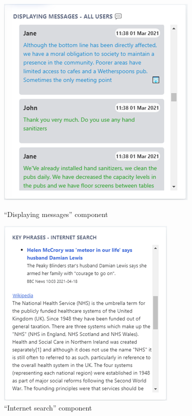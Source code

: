 \documentclass{article}
\begin{document}
\vspace{10pt}
\begin{figure}[H]
\centering
\begin{minipage}{.5\textwidth}
  \centering
  \includegraphics[width=1\linewidth]{charts/messages.png}
  \caption{``Displaying messages'' component}
  \label{fig:messages}
\end{minipage}%
\begin{minipage}{.5\textwidth}
  \centering
  \includegraphics[width=1\linewidth]{charts/internetsearch.png}
  \caption{``Internet search'' component}
  \label{fig:internetsearch}
\end{minipage}
\end{figure}
\end{document}
